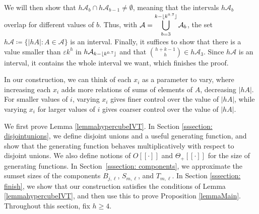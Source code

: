 \documentclass{daj}
\theoremstyle{definition}
\theoremstyle{remark}
\numberwithin{equation}{section}
\numberwithin{theorem}{section}
\newcommand{\cala}{\mathcal{A}}
\DeclarePairedDelimiter{\floor}{\lfloor}{\rfloor}
\begin{document}
We will then show that $h\cala_b \cap h\cala_{b-1} \neq \emptyset$, meaning that the intervals $h\cala_b$ overlap for different values of $b$. Thus, with $\cala = \displaystyle \bigcup_{b=3}^{k-\floor{k^{0.7}}} \cala_b$, the set $h\cala\coloneq \{|hA|: A \in \cala\}$ is an interval. Finally, it suffices to show that there is a value smaller than $\varepsilon k^h$ in $h\cala_{k-\floor{k^{0.7}}}$ and that $\binom{h+k-1}{h} \in h\cala_3$. Since $h\cala$ is an interval, it contains the whole interval we want, which finishes the proof.

In our construction, we can think of each $x_i$ as a parameter to vary, where increasing each $x_i$ adds more relations of sums of elements of $A$, decreasing $|hA|$. For smaller values of $i$, varying $x_i$ gives finer control over the value of $|hA|$, while varying $x_i$ for larger values of $i$ gives coarser control over the value of $|hA|$.

We first prove Lemma \ref{lemmahypercubeIVT}. In Section \ref{sssection: disjointunions}, we define disjoint unions and a useful generating function, and show that the generating function behaves multiplicatively with respect to disjoint unions. We also define notions of $ O[[\cdot]]$ and $\Theta_+[[\cdot]]$ for the size of generating functions. In Section~\ref{sssection: components}, we approximate the sumset sizes of the components $B_{j,\ell}$, $S_{m,\ell}$, and $T_{m,\ell}$. In Section \ref{sssection: finish}, we show that our construction satisfies the conditions of Lemma \ref{lemmahypercubeIVT}, and then use this to prove Proposition \ref{lemmaMain}. Throughout this section, fix $h \geq 4$.
\end{document}
